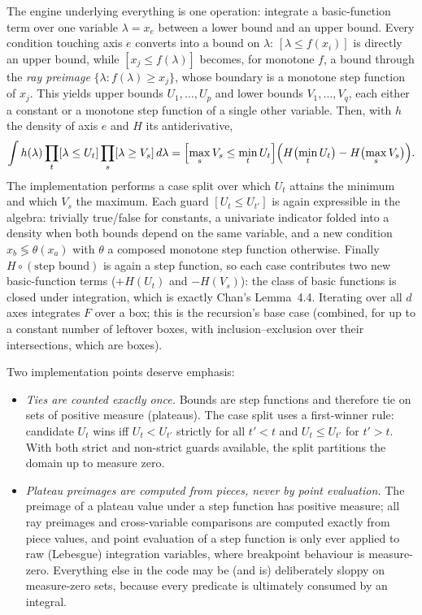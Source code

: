 \documentclass[11pt,a4paper]{article}
\theoremstyle{remark}
\begin{document}
The engine underlying everything is one operation: integrate a basic-function
term over one variable $\lambda=x_e$ between a lower bound and an upper
bound.  Every condition touching axis $e$ converts into a bound on $\lambda$:
$[\lambda\le f(x_i)]$ is directly an upper bound, while $[x_j\le f(\lambda)]$
becomes, for monotone $f$, a bound through the \emph{ray preimage}
$\{\lambda: f(\lambda)\ge x_j\}$, whose boundary is a monotone step function
of $x_j$.  This yields upper bounds $U_1,\dots,U_p$ and lower bounds
$V_1,\dots,V_q$, each either a constant or a monotone step function of a
single other variable.  Then, with $h$ the density of axis $e$ and $H$ its
antiderivative,
\[
\int h(\lambda)\prod_t[\lambda\le U_t]\prod_s[\lambda\ge V_s]\,d\lambda
=\Bigl[\max_s V_s\le \min_t U_t\Bigr]\Bigl(H\bigl(\min_t U_t\bigr)-H\bigl(\max_s V_s\bigr)\Bigr).
\]
The implementation performs a case split over which $U_t$ attains the
minimum and which $V_s$ the maximum.  Each guard $[U_t\le U_{t'}]$ is again
expressible in the algebra: trivially true/false for constants, a univariate
indicator folded into a density when both bounds depend on the same variable,
and a new condition $x_b\lessgtr\theta(x_a)$ with
$\theta$ a composed monotone step function otherwise.  Finally
$H\circ(\text{step bound})$ is again a step function, so each case
contributes two new basic-function terms ($+H(U_t)$ and $-H(V_s)$): the class
of basic functions is closed under integration, which is exactly Chan's
Lemma~4.4.  Iterating over all $d$ axes integrates $F$ over a box; this is
the recursion's base case (combined, for up to a constant number of leftover
boxes, with inclusion--exclusion over their intersections, which are boxes).

Two implementation points deserve emphasis:
\begin{itemize}\itemsep2pt
\item \emph{Ties are counted exactly once.}  Bounds are step functions and
  therefore tie on sets of positive measure (plateaus).  The case split uses
  a first-winner rule: candidate $U_t$ wins iff $U_t<U_{t'}$ strictly for all
  $t'<t$ and $U_t\le U_{t'}$ for $t'>t$.  With both strict and non-strict
  guards available, the split partitions the domain up to measure zero.
\item \emph{Plateau preimages are computed from pieces, never by point
  evaluation.}  The preimage of a plateau value under a step function has
  positive measure; all ray preimages and cross-variable comparisons are
  computed exactly from piece values, and point evaluation of a step function
  is only ever applied to raw (Lebesgue) integration variables, where
  breakpoint behaviour is measure-zero.  Everything else in the code may be
  (and is) deliberately sloppy on measure-zero sets, because every predicate
  is ultimately consumed by an integral.
\end{itemize}
\end{document}
